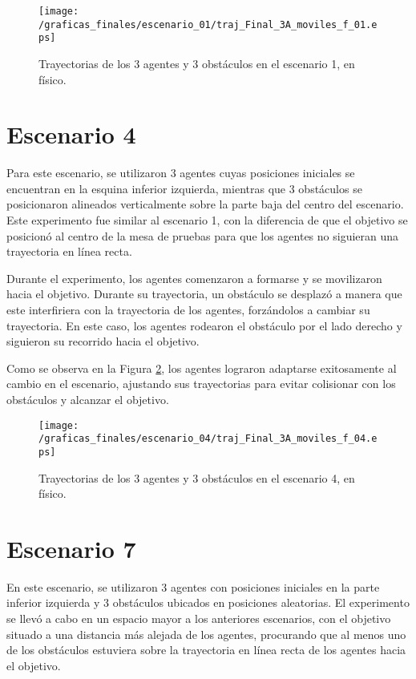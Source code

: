 \begin{figure}[H]
	\centering
	\texttt{[image: /graficas\_finales/escenario\_01/traj\_Final\_3A\_moviles\_f\_01.eps]}
	\caption{Trayectorias de los 3 agentes y 3 obstáculos en el escenario 1, en físico.}
	\label{fig3:escenario01_trajTodos}
\end{figure}


\newpage
\section{Escenario 4}
Para este escenario, se utilizaron 3 agentes cuyas posiciones iniciales se encuentran en la esquina inferior izquierda, mientras que 3 obstáculos se posicionaron alineados verticalmente sobre la parte baja del centro del escenario. Este experimento fue similar al escenario 1, con la diferencia de que el objetivo se posicionó al centro de la mesa de pruebas para que los agentes no siguieran una trayectoria en línea recta.

Durante el experimento, los agentes comenzaron a formarse y se movilizaron hacia el objetivo. Durante su trayectoria, un obstáculo se desplazó a manera que este interfiriera con la trayectoria de los agentes, forzándolos a cambiar su trayectoria. En este caso, los agentes rodearon el obstáculo por el lado derecho y siguieron su recorrido hacia el objetivo.

Como se observa en la Figura \ref{fig3:escenario04_trajTodos}, los agentes lograron adaptarse exitosamente al cambio en el escenario, ajustando sus trayectorias para evitar colisionar con los obstáculos y alcanzar el objetivo.

\begin{figure}[H]
	\centering
	\texttt{[image: /graficas\_finales/escenario\_04/traj\_Final\_3A\_moviles\_f\_04.eps]}
	\caption{Trayectorias de los 3 agentes y 3 obstáculos en el escenario 4, en físico.}
	\label{fig3:escenario04_trajTodos}
\end{figure}


\newpage
\section{Escenario 7}
En este escenario, se utilizaron 3 agentes con posiciones iniciales en la parte inferior izquierda y 3 obstáculos ubicados en posiciones aleatorias. El experimento se llevó a cabo en un espacio mayor a los anteriores escenarios, con el objetivo situado a una distancia más alejada de los agentes, procurando que al menos uno de los obstáculos estuviera sobre la trayectoria en línea recta de los agentes hacia el objetivo.

